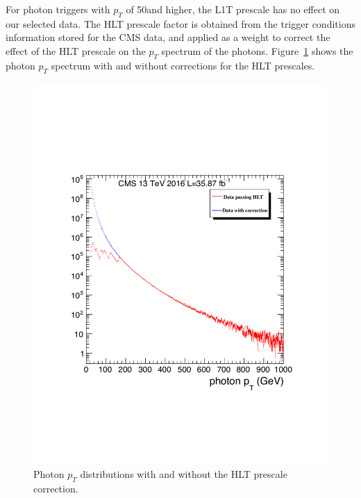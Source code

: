 For photon triggers with $p_T$ of 50\GeV and higher, the L1T prescale has no effect on our selected data. The HLT prescale factor is obtained from the trigger conditions information stored for the CMS data, and applied as a weight to correct the effect of the HLT prescale on the $p_T$ spectrum of the photons. Figure~\ref{fig:photon_pt_prescale} shows the photon $p_T$ spectrum with and without corrections for the HLT prescales.


\begin{figure}[htbp]
\begin{center}
\includegraphics[width=0.86\linewidth]{figures/bg_photonHLT_reweight.pdf}
\caption{Photon $p_T$ distributions with and without the HLT prescale correction. }
\label{fig:photon_pt_prescale}
\end{center}
\end{figure}

